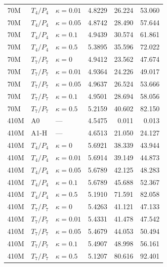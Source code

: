 {\begin{longtable}{@{}lllrrr@{}}
70M & $T_4/P_4$ & $\kappa=0.01$ & 4.8229 & 26.224 & 53.060 \\
70M & $T_4/P_4$ & $\kappa=0.05$ & 4.8742 & 28.490 & 57.644 \\
70M & $T_4/P_4$ & $\kappa=0.1$ & 4.9439 & 30.574 & 61.861 \\
70M & $T_4/P_4$ & $\kappa=0.5$ & 5.3895 & 35.596 & 72.022 \\
70M & $T_7/P_7$ & $\kappa=0$ & 4.9412 & 23.562 & 47.674 \\
70M & $T_7/P_7$ & $\kappa=0.01$ & 4.9364 & 24.226 & 49.017 \\
70M & $T_7/P_7$ & $\kappa=0.05$ & 4.9637 & 26.524 & 53.666 \\
70M & $T_7/P_7$ & $\kappa=0.1$ & 4.9501 & 28.694 & 58.056 \\
70M & $T_7/P_7$ & $\kappa=0.5$ & 5.2159 & 40.602 & 82.150 \\
410M & A0 & --- & 4.5475 & 0.011 & 0.013 \\
410M & A1-H & --- & 4.6513 & 21.050 & 24.127 \\
410M & $T_4/P_4$ & $\kappa=0$ & 5.6921 & 38.339 & 43.944 \\
410M & $T_4/P_4$ & $\kappa=0.01$ & 5.6914 & 39.149 & 44.873 \\
410M & $T_4/P_4$ & $\kappa=0.05$ & 5.6789 & 42.125 & 48.283 \\
410M & $T_4/P_4$ & $\kappa=0.1$ & 5.6789 & 45.688 & 52.367 \\
410M & $T_4/P_4$ & $\kappa=0.5$ & 5.1910 & 71.591 & 82.058 \\
410M & $T_7/P_7$ & $\kappa=0$ & 5.4263 & 41.121 & 47.133 \\
410M & $T_7/P_7$ & $\kappa=0.01$ & 5.4331 & 41.478 & 47.542 \\
410M & $T_7/P_7$ & $\kappa=0.05$ & 5.4679 & 44.053 & 50.494 \\
410M & $T_7/P_7$ & $\kappa=0.1$ & 5.4907 & 48.998 & 56.161 \\
410M & $T_7/P_7$ & $\kappa=0.5$ & 5.1207 & 80.616 & 92.401 \\
\end{longtable}}
